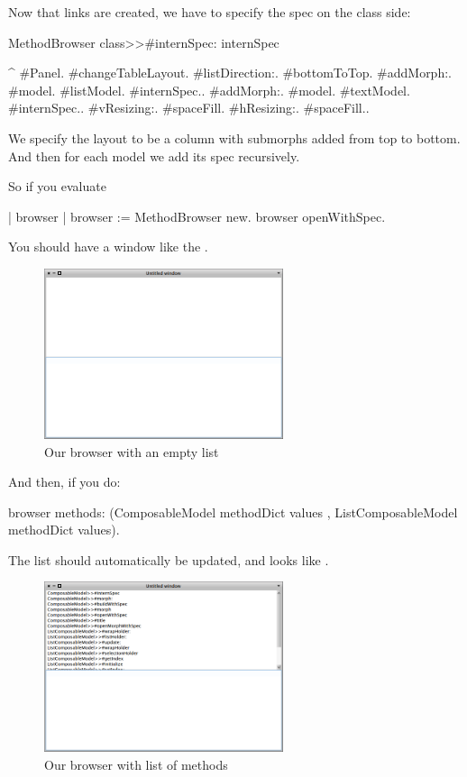 \documentclass[a4paper,10pt,twoside]{book}
\begin{document}
Now that links are created, we have to specify the spec on the class side:

\begin{method}{MethodBrowser class>>\#internSpec:}
internSpec

	^{ #Panel.
			#changeTableLayout.
			#listDirection:. #bottomToTop.
			#addMorph:. {#model. #listModel. #internSpec.}.
			#addMorph:. {#model. #textModel. #internSpec.}.
			#vResizing:. #spaceFill.
			#hResizing:. #spaceFill.}.
\end{method}
%
We specify the layout to be a column with submorphs added from top to bottom. And then for each model we add its spec recursively.

So if you evaluate
%
\begin{code}{}
| browser |
browser := MethodBrowser new.
browser openWithSpec.
\end{code}
You should have a window like the .
\begin{figure}[ht]
\begin{center}
	\includegraphics[width=7cm]{MethodBrowser1}
	\caption{Our browser with an empty list}
\end{center}
\end{figure}

And then, if you do:
%
\begin{code}{}
browser  methods: (ComposableModel methodDict values , ListComposableModel methodDict values).
\end{code}
The list should automatically be updated, and looks like .
\begin{figure}[ht]
\begin{center}
	\includegraphics[width=7cm]{MethodBrowser2}
	\caption{Our browser with list of methods}
\end{center}
\end{figure}
\end{document}
